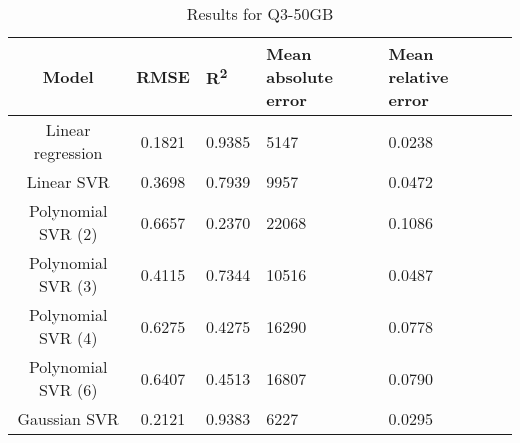 \begin{table}[H]
\centering
\begin{adjustbox}{center}
\begin{tabular}{c | c M{1.2cm} M{2.5cm} M{2.5cm} M{1.8cm}}
Model & RMSE & R\textsuperscript{2} & Mean absolute error & Mean relative error \tabularnewline
\hline
Linear regression & 0.1821 & 0.9385 &   5147 & 0.0238 \\
Linear SVR & 0.3698 & 0.7939 &   9957 & 0.0472 \\
Polynomial SVR (2) & 0.6657 & 0.2370 &  22068 & 0.1086 \\
Polynomial SVR (3) & 0.4115 & 0.7344 &  10516 & 0.0487 \\
Polynomial SVR (4) & 0.6275 & 0.4275 &  16290 & 0.0778 \\
Polynomial SVR (6) & 0.6407 & 0.4513 &  16807 & 0.0790 \\
Gaussian SVR & 0.2121 & 0.9383 &   6227 & 0.0295 \\
\end{tabular}
\end{adjustbox}
\\
\caption{Results for Q3-50GB}
\label{tab:all_linear_Q3_50}
\end{table}
